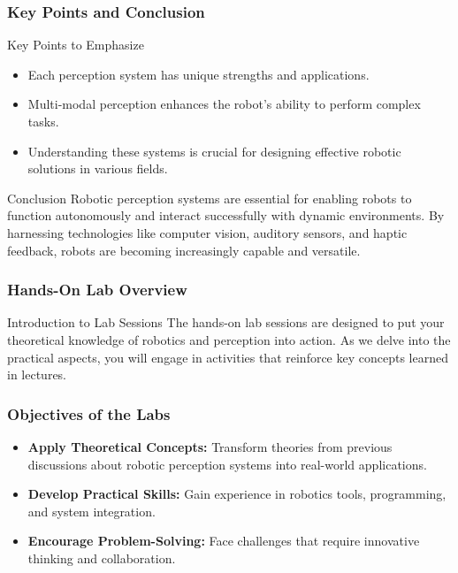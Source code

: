 \documentclass{beamer}
\begin{document}
\begin{frame}[fragile]
    \frametitle{Key Points and Conclusion}
    \begin{block}{Key Points to Emphasize}
        \begin{itemize}
            \item Each perception system has unique strengths and applications.
            \item Multi-modal perception enhances the robot's ability to perform complex tasks.
            \item Understanding these systems is crucial for designing effective robotic solutions in various fields.
        \end{itemize}
    \end{block}

    \begin{block}{Conclusion}
        Robotic perception systems are essential for enabling robots to function autonomously and interact successfully with dynamic environments. By harnessing technologies like computer vision, auditory sensors, and haptic feedback, robots are becoming increasingly capable and versatile.
    \end{block}
\end{frame}

\begin{frame}[fragile]
    \frametitle{Hands-On Lab Overview}
    \begin{block}{Introduction to Lab Sessions}
        The hands-on lab sessions are designed to put your theoretical knowledge of robotics and perception into action. As we delve into the practical aspects, you will engage in activities that reinforce key concepts learned in lectures.
    \end{block}
\end{frame}

\begin{frame}[fragile]
    \frametitle{Objectives of the Labs}
    \begin{itemize}
        \item \textbf{Apply Theoretical Concepts:} Transform theories from previous discussions about robotic perception systems into real-world applications.
        \item \textbf{Develop Practical Skills:} Gain experience in robotics tools, programming, and system integration.
        \item \textbf{Encourage Problem-Solving:} Face challenges that require innovative thinking and collaboration.
    \end{itemize}
\end{frame}
\end{document}
